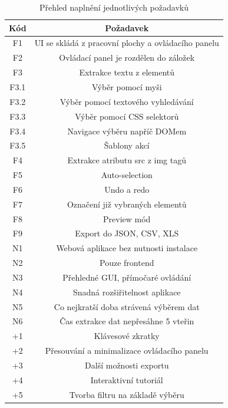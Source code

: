 \documentclass[thesis=B,czech]{FITthesis}[2012/06/26]
\begin{document}
\begin{table}
	\centering
	\caption{Přehled naplnění jednotlivých požadavků}
	\label{table:requirements}
	\begin{tabular}{ | c | c | }
		\hline
		Kód & Požadavek \\
		\hline
		\rowcolor{lightgreen}
		F1 & UI se skládá z pracovní plochy a ovládacího panelu \\
		\rowcolor{lightgreen}
		F2 & Ovládací panel je rozdělen do záložek \\
		\rowcolor{lightgreen}
		F3 & Extrakce textu z elementů \\
		\rowcolor{lightgreen}
		F3.1 & Výběr pomocí myši \\
		\rowcolor{lightgreen}
		F3.2 & Výběr pomocí textového vyhledávání \\
		\rowcolor{lightgreen}
		F3.3 & Výběr pomocí CSS selektorů \\
		\rowcolor{lightgreen}
		F3.4 & Navigace výběru napříč DOMem \\
		\rowcolor{lightred}
		F3.5 & Šablony akcí \\
		\rowcolor{lightgreen}
		F4 & Extrakce atributu \textsf{src} z img tagů \\
		\rowcolor{lightgreen}
		F5 & Auto-selection \\
		\rowcolor{lightgreen}
		F6 & Undo a redo \\
		\rowcolor{lightgreen}
		F7 & Označení již vybraných elementů \\
		\rowcolor{lightgreen}
		F8 & Preview mód \\
		\rowcolor{lightyellow}
		F9 & Export do JSON, CSV, XLS \\
		\hline
		\rowcolor{lightred}
		N1 & Webová aplikace bez nutnosti instalace \\
		\rowcolor{lightgreen}
		N2 & Pouze frontend \\
		\rowcolor{lightgreen}
		N3 & Přehledné GUI, přímočaré ovládání \\
		\rowcolor{lightgreen}
		N4 & Snadná rozšiřitelnost aplikace \\
		\rowcolor{lightgreen}
		N5 & Co nejkratší doba strávená výběrem dat \\
		\rowcolor{lightgreen}
		N6 & Čas extrakce dat nepřesáhne 5 vteřin \\
		\hline
		\rowcolor{lightred}
		+1 & Klávesové zkratky \\
		\rowcolor{lightgreen}
		+2 & Přesouvání a minimalizace ovládacího panelu \\
		\rowcolor{lightred}
		+3 & Další možnosti exportu \\
		\rowcolor{lightred}
		+4 & Interaktivní tutoriál \\
		\rowcolor{lightred}
		+5 & Tvorba filtru na základě výběru \\
		\hline
	\end{tabular}
\end{table}
\end{document}
